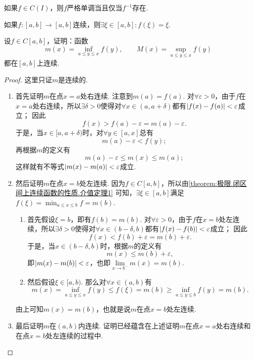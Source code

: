 \begin{corollary}
如果\(f \in C(I)\)，则\(f\)严格单调当且仅当\(f^{-1}\)存在.
\end{corollary}

\begin{corollary}
如果\(f\colon[a,b]\to[a,b]\)连续，则\(\exists\xi\in[a,b]: f(\xi)=\xi\).
\end{corollary}

\begin{example}
设\(f \in C[a,b]\)，证明：函数\[
m(x) = \inf\limits_{a \leq y \leq x} f(y), \qquad
M(x) = \sup\limits_{a \leq y \leq x} f(y)
\]都在\([a,b]\)上连续.
\begin{proof}
这里只证\(m\)是连续的.
\begin{enumerate}
\item 首先证明\(m\)在点\(x=a\)处右连续.
注意到\(m(a) = f(a)\).
对\(\forall\varepsilon>0\)，由于\(f\)在\(x=a\)处右连续，所以\(\exists\delta>0\)使得对\(\forall x\in(a,a+\delta)\)都有\(\abs{f(x)-f(a)}<\varepsilon\)成立；
因此\[
f(x)
> f(a) - \varepsilon
= m(a) - \varepsilon.
\]
于是，当\(x\in[a,a+\delta)\)时，对\(\forall y\in[a,x]\)总有\[
m(a) - \varepsilon < f(y);
\]再根据\(m\)的定义有\[
m(a) - \varepsilon \leq m(x) \leq m(a);
\]这样就有不等式\(\abs{m(x)-m(a)}<\varepsilon\)成立.

\item 然后证明\(m\)在点\(x=b\)处左连续.
因为\(f \in C[a,b]\)，所以由\cref{theorem:极限.闭区间上连续函数的性质.介值定理1} 可知，\(\exists\xi\in[a,b]\)满足\(f(\xi) = \min_{a \leq x \leq b} f = m(b)\).
	\begin{enumerate}
	\item 首先假设\(\xi=b\)，即有\(f(b)=m(b)\).
	对\(\forall\varepsilon>0\)，由于\(f\)在\(x=b\)处左连续，所以\(\exists\delta>0\)使得对\(\forall x\in(b-\delta,b)\)都有\(\abs{f(x)-f(b)}<\varepsilon\)成立；
	因此\[
	f(x)
	< f(b) + \varepsilon
	= m(b) + \varepsilon.
	\]
	于是，当\(x\in(b-\delta,b)\)时，根据\(m\)的定义有\[
	m(x) \leq m(b) + \varepsilon,
	\]
	即\(\abs{m(x)-m(b)}<\varepsilon\)，也即\(\lim\limits_{x \to b^-} m(x) = m(b)\).

	\item 然后假设\(\xi\in[a,b)\).
	那么对\(\forall x\in(a,b)\)有\[
	m(x) = \inf\limits_{a \leq y \leq x} f(y)
	\leq f(\xi)
	= m(b)
	\geq \inf\limits_{a \leq y \leq b} f(y)
	= m(b).
	\]
	\end{enumerate}
	由上可知\(m(x) = m(b)\)，也就是说\(m\)在点\(x=b\)处左连续.

\item 最后证明\(m\)在\((a,b)\)内连续.
证明已经蕴含在上述证明\(m\)在点\(x=a\)处右连续和在点\(x=b\)处左连续的过程中.
\qedhere
\end{enumerate}
\end{proof}
\end{example}


